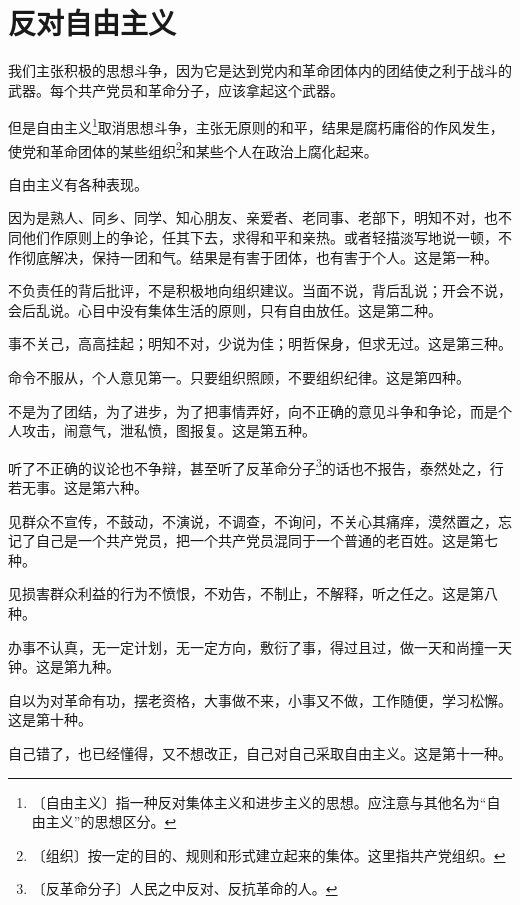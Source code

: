 \documentclass[12pt,UTF-8,openany]{ctexbook}
\begin{document}
\chapter{反对自由主义}

\begin{normalsize}
    
    我们主张积极的思想斗争，因为它是达到党内和革命团体内的团结使之利于战斗的武器。每个共产党员和革命分子，应该拿起这个武器。
    
    但是自由主义\footnote{〔自由主义〕指一种反对集体主义和进步主义的思想。应注意与其他名为“自由主义”的思想区分。}取消思想斗争，主张无原则的和平，结果是腐朽庸俗的作风发生，使党和革命团体的某些组织\footnote{〔组织〕按一定的目的、规则和形式建立起来的集体。这里指共产党组织。}和某些个人在政治上腐化起来。
    
    自由主义有各种表现。
    
    因为是熟人、同乡、同学、知心朋友、亲爱者、老同事、老部下，明知不对，也不同他们作原则上的争论，任其下去，求得和平和亲热。或者轻描淡写地说一顿，不作彻底解决，保持一团和气。结果是有害于团体，也有害于个人。这是第一种。
    
    不负责任的背后批评，不是积极地向组织建议。当面不说，背后乱说；开会不说，会后乱说。心目中没有集体生活的原则，只有自由放任。这是第二种。
    
    事不关己，高高挂起；明知不对，少说为佳；明哲保身，但求无过。这是第三种。
    
    命令不服从，个人意见第一。只要组织照顾，不要组织纪律。这是第四种。
    
    不是为了团结，为了进步，为了把事情弄好，向不正确的意见斗争和争论，而是个人攻击，闹意气，泄私愤，图报复。这是第五种。
    
    听了不正确的议论也不争辩，甚至听了反革命分子\footnote{〔反革命分子〕人民之中反对、反抗革命的人。}的话也不报告，泰然处之，行若无事。这是第六种。
    
    见群众不宣传，不鼓动，不演说，不调查，不询问，不关心其痛痒，漠然置之，忘记了自己是一个共产党员，把一个共产党员混同于一个普通的老百姓。这是第七种。
    
    见损害群众利益的行为不愤恨，不劝告，不制止，不解释，听之任之。这是第八种。
    
    办事不认真，无一定计划，无一定方向，敷衍了事，得过且过，做一天和尚撞一天钟。这是第九种。
    
    自以为对革命有功，摆老资格，大事做不来，小事又不做，工作随便，学习松懈。这是第十种。
    
    自己错了，也已经懂得，又不想改正，自己对自己采取自由主义。这是第十一种。
    

\end{normalsize}
\end{document}
